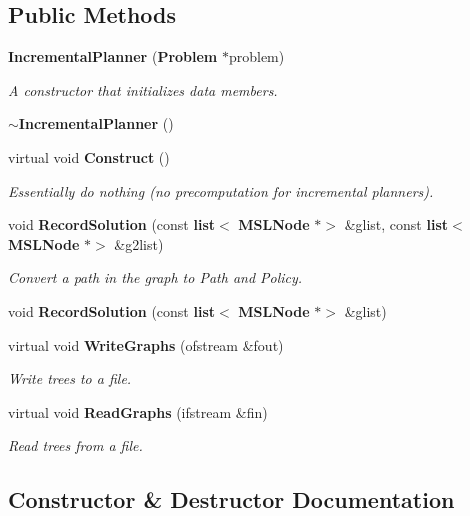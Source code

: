 \subsection*{Public Methods}
\begin{CompactItemize}
\item 
{\bf Incremental\-Planner} ({\bf Problem} $\ast$problem)
\begin{CompactList}\small\item\em A constructor that initializes data members.\item\end{CompactList}\item 
{\bf $\sim$Incremental\-Planner} ()
\item 
virtual void {\bf Construct} ()
\begin{CompactList}\small\item\em Essentially do nothing (no precomputation for incremental planners).\item\end{CompactList}\item 
void {\bf Record\-Solution} (const {\bf list}$<$ {\bf MSLNode} $\ast$$>$ \&glist, const {\bf list}$<$ {\bf MSLNode} $\ast$$>$ \&g2list)
\begin{CompactList}\small\item\em Convert a path in the graph to Path and Policy.\item\end{CompactList}\item 
void {\bf Record\-Solution} (const {\bf list}$<$ {\bf MSLNode} $\ast$$>$ \&glist)
\item 
virtual void {\bf Write\-Graphs} (ofstream \&fout)
\begin{CompactList}\small\item\em Write trees to a file.\item\end{CompactList}\item 
virtual void {\bf Read\-Graphs} (ifstream \&fin)
\begin{CompactList}\small\item\em Read trees from a file.\item\end{CompactList}\end{CompactItemize}


\subsection{Constructor \& Destructor Documentation}
